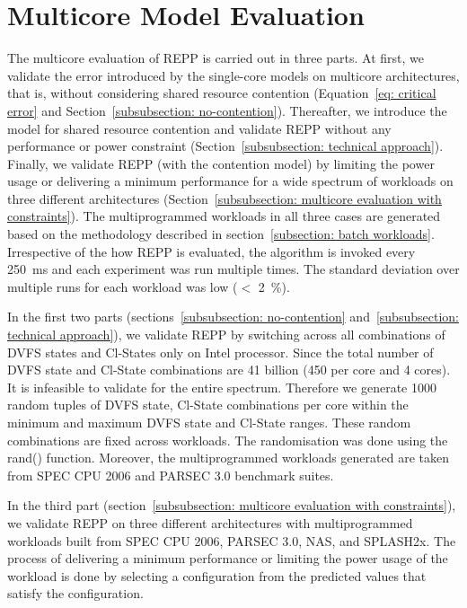 \section{Multicore Model Evaluation}
\label{subsection: evaluation repp-h}

The multicore evaluation of REPP is carried out in three parts. At first, we validate the
error introduced by the single-core models on multicore architectures, that is, without
considering shared resource contention (Equation~\ref{eq: critical error} and
Section~\ref{subsubsection: no-contention}).  Thereafter, we introduce the model for
shared resource contention and validate REPP without any performance or power constraint
(Section~\ref{subsubsection: technical approach}).  Finally, we validate REPP (with the
contention model) by limiting the power usage or delivering a minimum performance for a
wide spectrum of workloads on three different architectures (Section~\ref{subsubsection:
multicore evaluation with constraints}). The multiprogrammed workloads in all three cases
are generated based on the methodology described in section~\ref{subsection: batch
workloads}.  Irrespective of the how REPP is evaluated, the algorithm is invoked every
\SI{250}{\milli\second} and each experiment was run multiple times. The standard deviation
over multiple runs for each workload was low ($<$ \SI{2}{\percent}).

 In the first two parts (sections~\ref{subsubsection: no-contention}
and~\ref{subsubsection: technical approach}), we validate REPP by switching across all
combinations of DVFS states and Cl-States only on Intel processor.  Since the total number
of DVFS state and Cl-State combinations are 41 billion (450 per core and 4 cores).  It is
infeasible to validate for the entire spectrum.  Therefore we generate 1000 random tuples
of DVFS state, Cl-State combinations per core within the minimum and maximum DVFS state
and Cl-State ranges.  These random combinations are fixed across workloads. The
randomisation was done using the \textsf{rand()} function.  Moreover, the multiprogrammed
workloads generated are taken from SPEC CPU 2006 and PARSEC 3.0 benchmark suites. 

 In the third part (section~\ref{subsubsection: multicore evaluation with
constraints}), we validate REPP on three different architectures with multiprogrammed
workloads built from SPEC CPU 2006, PARSEC 3.0, NAS, and SPLASH2x.  The process of
delivering a minimum performance or limiting the power usage of the workload is done by
selecting a configuration from the predicted values that satisfy the configuration. 

